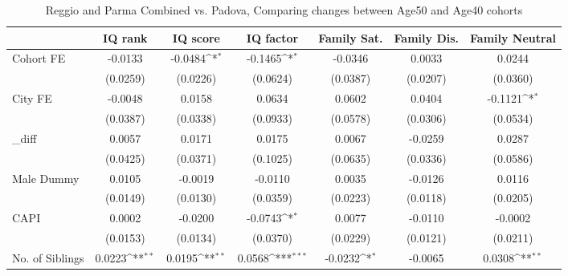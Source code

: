 \begin{table}[htbp]\centering
\def\sym#1{\ifmmode^{#1}\else\(^{#1}\)\fi}
\caption{Reggio and Parma Combined vs. Padova, Comparing changes between Age50 and Age40 cohorts}
\begin{tabular}{l*{6}{c}}
\toprule
            &\multicolumn{1}{c}{IQ rank}&\multicolumn{1}{c}{IQ score}&\multicolumn{1}{c}{IQ factor}&\multicolumn{1}{c}{Family Sat.}&\multicolumn{1}{c}{Family Dis.}&\multicolumn{1}{c}{Family Neutral}\\
\midrule
Cohort FE   &     -0.0133         &     -0.0484\sym{*}  &     -0.1465\sym{*}  &     -0.0346         &      0.0033         &      0.0244         \\
            &    (0.0259)         &    (0.0226)         &    (0.0624)         &    (0.0387)         &    (0.0207)         &    (0.0360)         \\
\addlinespace
City FE     &     -0.0048         &      0.0158         &      0.0634         &      0.0602         &      0.0404         &     -0.1121\sym{*}  \\
            &    (0.0387)         &    (0.0338)         &    (0.0933)         &    (0.0578)         &    (0.0306)         &    (0.0534)         \\
\addlinespace
\_diff       &      0.0057         &      0.0171         &      0.0175         &      0.0067         &     -0.0259         &      0.0287         \\
            &    (0.0425)         &    (0.0371)         &    (0.1025)         &    (0.0635)         &    (0.0336)         &    (0.0586)         \\
\addlinespace
Male Dummy  &      0.0105         &     -0.0019         &     -0.0110         &      0.0035         &     -0.0126         &      0.0116         \\
            &    (0.0149)         &    (0.0130)         &    (0.0359)         &    (0.0223)         &    (0.0118)         &    (0.0205)         \\
\addlinespace
CAPI        &      0.0002         &     -0.0200         &     -0.0743\sym{*}  &      0.0077         &     -0.0110         &     -0.0002         \\
            &    (0.0153)         &    (0.0134)         &    (0.0370)         &    (0.0229)         &    (0.0121)         &    (0.0211)         \\
\addlinespace
No. of Siblings&      0.0223\sym{**} &      0.0195\sym{**} &      0.0568\sym{***}&     -0.0232\sym{*}  &     -0.0065         &      0.0308\sym{**} \\

\end{tabular}
\end{table}
